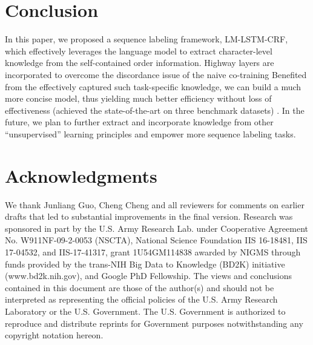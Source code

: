 \documentclass[letterpaper]{article} \usepackage{aaai18}  \usepackage{times}  \usepackage{helvet}  \usepackage{courier}  \usepackage{url}  \usepackage{graphicx}  \usepackage{multirow}
\newcommand{\our}{\textsc{LM-LSTM-CRF}\xspace}
\begin{document}
\section{Conclusion}
\label{sect:con}

In this paper, we proposed a sequence labeling framework, \our, which effectively leverages the language model to extract character-level knowledge from the self-contained order information.
Highway layers are incorporated to overcome the discordance issue of the naive co-training
Benefited from the effectively captured such task-specific knowledge, we can build a much more concise model, thus yielding much better efficiency without loss of effectiveness (achieved the state-of-the-art on three benchmark datasets) . 
In the future, we plan to further extract and incorporate knowledge from other ``unsupervised'' learning principles and empower more sequence labeling tasks.


\section*{Acknowledgments}
\label{sect:ack}

We thank Junliang Guo, Cheng Cheng and all reviewers for comments on earlier drafts that led to substantial improvements in the final version.
Research was sponsored in part by the U.S. Army Research Lab. under Cooperative Agreement No. W911NF-09-2-0053 (NSCTA), National Science Foundation IIS 16-18481, IIS 17-04532, and IIS-17-41317, grant 1U54GM114838 awarded by NIGMS through funds provided by the trans-NIH Big Data to Knowledge (BD2K) initiative (www.bd2k.nih.gov), and Google PhD Fellowship. 
The views and conclusions contained in this document are those of the author(s) and should not be interpreted as representing the official policies of the U.S. Army Research Laboratory or the U.S. Government. The U.S. Government is authorized to reproduce and distribute reprints for Government purposes notwithstanding any copyright notation hereon.




\end{document}

